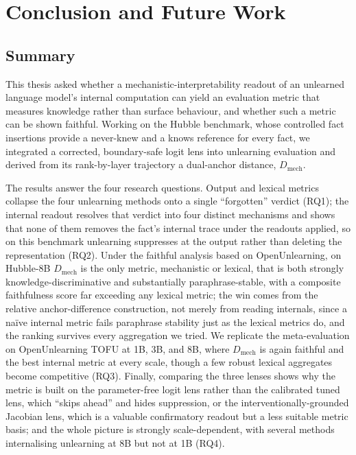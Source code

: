 \chapter{Conclusion and Future Work}
\label{ch:conclusion}

\section{Summary}
\label{sec:c-summary}

This thesis asked whether a mechanistic-interpretability readout of an unlearned language model's internal
computation can yield an evaluation metric that measures knowledge rather than surface behaviour, and
whether such a metric can be shown faithful. Working on the Hubble benchmark, whose controlled fact
insertions provide a never-knew and a knows reference for every fact, we integrated a corrected,
boundary-safe logit lens into unlearning evaluation and derived from its rank-by-layer trajectory a
dual-anchor distance, $D_\text{mech}$.

The results answer the four research questions. Output and lexical metrics collapse the four unlearning
methods onto a single ``forgotten'' verdict (RQ1); the internal readout resolves that verdict into four
distinct mechanisms and shows that none of them removes the fact's internal trace under the readouts
applied, so on this benchmark unlearning suppresses at the output rather than deleting the representation
(RQ2). Under the faithful analysis based on OpenUnlearning, on Hubble-8B $D_\text{mech}$ is the only metric,
mechanistic or lexical, that is both strongly knowledge-discriminative and substantially paraphrase-stable,
with a composite faithfulness score far exceeding any lexical metric; the win comes from the
relative anchor-difference construction, not merely from reading internals, since a na\"ive internal metric
fails paraphrase stability just as the lexical metrics do, and the ranking survives every aggregation we
tried. We replicate the meta-evaluation on OpenUnlearning TOFU at 1B, 3B, and 8B, where $D_\text{mech}$ is
again faithful and the best internal metric at every scale, though a few robust lexical aggregates become
competitive (RQ3). Finally, comparing the three lenses shows why the metric is built on the parameter-free
logit lens rather than the calibrated tuned lens, which ``skips ahead'' and hides suppression, or the
interventionally-grounded Jacobian lens, which is a valuable confirmatory readout but a less suitable metric
basis; and the whole picture is strongly scale-dependent, with several methods internalising unlearning at
8B but not at 1B (RQ4).

